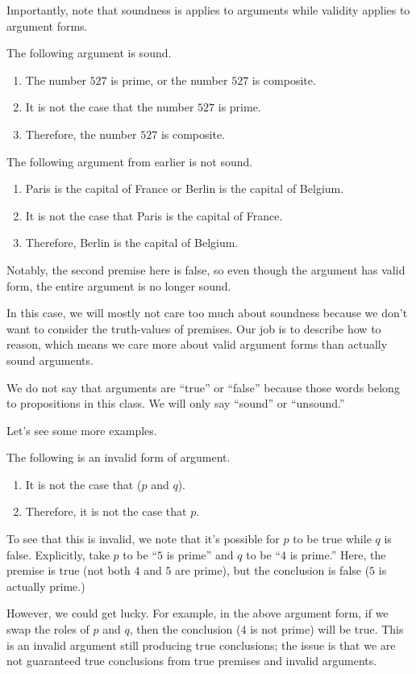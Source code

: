 \documentclass[../notes.tex]{subfiles}
\begin{document}
Importantly, note that soundness is applies to arguments while validity applies to argument forms.
\begin{example}
	The following argument is sound.
	\begin{enumerate}
		\item The number $527$ is prime, or the number $527$ is composite.
		\item It is not the case that the number $527$ is prime.
		\item Therefore, the number $527$ is composite.
	\end{enumerate}
\end{example}
\begin{nex}
	The following argument from earlier is not sound.
	\begin{enumerate}
		\item Paris is the capital of France or Berlin is the capital of Belgium.
		\item It is not the case that Paris is the capital of France.
		\item Therefore, Berlin is the capital of Belgium.
	\end{enumerate}
	Notably, the second premise here is false, so even though the argument has valid form, the entire argument is no longer sound.
\end{nex}
In this case, we will mostly not care too much about soundness because we don't want to consider the truth-values of premises. Our job is to describe how to reason, which means we care more about valid argument forms than actually sound arguments.
\begin{remark}
	We do not say that arguments are ``true'' or ``false'' because those words belong to propositions in this class. We will only say ``sound'' or ``unsound.''
\end{remark}
Let's see some more examples.
\begin{nex}
	The following is an invalid form of argument.
	\begin{enumerate}
		\item It is not the case that ($p$ and $q$).
		\item Therefore, it is not the case that $p$.
	\end{enumerate}
	To see that this is invalid, we note that it's possible for $p$ to be true while $q$ is false. Explicitly, take $p$ to be ``$5$ is prime'' and $q$ to be ``$4$ is prime.'' Here, the premise is true (not both $4$ and $5$ are prime), but the conclusion is false ($5$ is actually prime.)
\end{nex}
However, we could get lucky. For example, in the above argument form, if we swap the roles of $p$ and $q$, then the conclusion ($4$ is not prime) will be true. This is an invalid argument still producing true conclusions; the issue is that we are not guaranteed true conclusions from true premises and invalid arguments.
\end{document}
